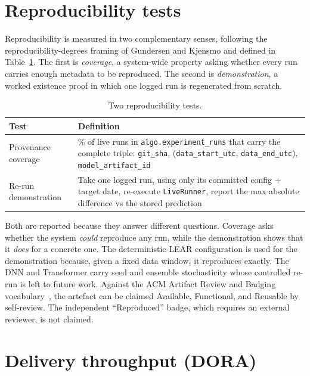 \section{Reproducibility tests}
\label{sec:ef-repro}

Reproducibility is measured in two complementary senses, following the
reproducibility-degrees framing of Gundersen and Kjensmo
\cite{gundersen2018reproducibility} and defined in Table~\ref{tab:ef-repro-tests}.
The first is \emph{coverage}, a system-wide property asking whether every run
carries enough metadata to be reproduced. The second is \emph{demonstration}, a
worked existence proof in which one logged run is regenerated from scratch.

\begin{table}[h]
  \centering
  \caption{Two reproducibility tests.}
  \label{tab:ef-repro-tests}
  \begin{tabularx}{\linewidth}{@{}l X@{}}
    \toprule
    \textbf{Test} & \textbf{Definition} \\
    \midrule
    Provenance coverage   & \% of live runs in \texttt{algo.experiment\_runs} that carry the complete triple: \texttt{git\_sha}, (\texttt{data\_start\_utc}, \texttt{data\_end\_utc}), \texttt{model\_artifact\_id} \\
    Re-run demonstration  & Take one logged run, using only its committed config + target date, re-execute \texttt{LiveRunner}, report the max absolute difference vs the stored prediction \\
    \bottomrule
  \end{tabularx}
\end{table}

Both are reported because they answer different questions. Coverage asks whether
the system \emph{could} reproduce any run, while the demonstration shows that it
\emph{does} for a concrete one. The deterministic LEAR configuration is used for
the demonstration because, given a fixed data window, it reproduces exactly. The
DNN and Transformer carry seed and ensemble stochasticity whose controlled
re-run is left to future work. Against the ACM Artifact Review and Badging
vocabulary~\cite{acm2020badging}, the artefact can be claimed Available,
Functional, and Reusable by self-review. The independent ``Reproduced'' badge,
which requires an external reviewer, is not claimed.

\section{Delivery throughput (DORA)}
\label{sec:ef-dora}


